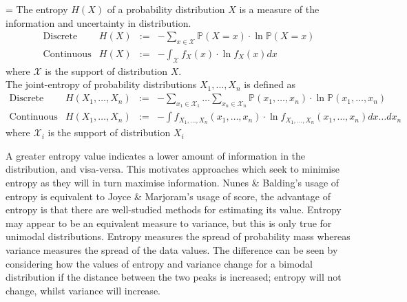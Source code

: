 \documentclass[11pt,a4paper]{article}
\newcommand*{\prob}{\mathbb{P}}
\theoremstyle{break}
\begin{document}
  \begin{box_definition}
    \everymath={\displaystyle}
    The entropy $H(X)$ of a probability distribution $X$ is a measure of the information and uncertainty in distribution.
    \[\begin{array}{rrcl}
      \text{Discrete}&H(X)&:=&-\sum_{x\in\mathcal{X}}\prob(X=x)\cdot\ln\prob(X=x)\\
      \text{Continuous}&H(X)&:=&-\int_{\mathcal{X}}f_X(x)\cdot\ln f_X(x)dx
    \end{array}\]
    where $\mathcal{X}$ is the support of distribution $X$.\\
    The joint-entropy of probability distributions $X_1,\dots,X_n$ is defined as
    \[\begin{array}{rrcl}
      \text{Discrete}&H(X_1,\dots,X_n)&:=&-\sum_{x_1\in\mathcal{X}_1}\dots\sum_{x_n\in\mathcal{X}_n}\prob(x_1,\dots,x_n)\cdot\ln\prob(x_1,\dots,x_n)\\
      \text{Continuous}&H(X_1,\dots,X_n)&:=&-\int f_{X_1,\dots,X_n}(x_1,\dots,x_n)\cdot\ln f_{X_1,\dots,X_n}(x_1,\dots,x_n)dx\dots dx_n
    \end{array}\]
    where $\mathcal{X}_i$ is the support of distribution $X_i$
  \end{box_definition}

  \par A greater entropy value indicates a lower amount of information in the distribution, and visa-versa. This motivates approaches which seek to minimise entropy as they will in turn maximise information. Nunes \& Balding's usage of entropy is equivalent to Joyce \& Marjoram's usage of score, the advantage of entropy is that there are well-studied methods for estimating its value. Entropy may appear to be an equivalent measure to variance, but this is only true for unimodal distributions. Entropy measures the spread of probability mass whereas variance measures the spread of the data values. The difference can be seen by considering how the values of entropy and variance change for a bimodal distribution if the distance between the two peaks is increased; entropy will not change, whilst variance will increase.

\end{document}
